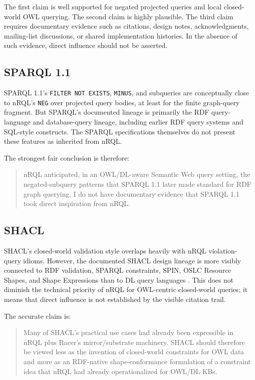 \documentclass[11pt,letterpaper]{article}
\newcommand{\nrql}{nRQL}
\newcommand{\shacl}{SHACL}
\begin{document}
The first claim is well supported for negated projected queries and local closed-world OWL querying. The second claim is highly plausible. The third claim requires documentary evidence such as citations, design notes, acknowledgments, mailing-list discussions, or shared implementation histories. In the absence of such evidence, direct influence should not be asserted.

\subsection{SPARQL 1.1}

SPARQL 1.1's \texttt{FILTER NOT EXISTS}, \texttt{MINUS}, and subqueries are conceptually close to \nrql{}'s \texttt{NEG} over projected query bodies, at least for the finite graph-query fragment. But SPARQL's documented lineage is primarily the RDF query-language and database-query lineage, including earlier RDF query systems and SQL-style constructs. The SPARQL specifications themselves do not present these features as inherited from \nrql{}.

The strongest fair conclusion is therefore:

\begin{quote}
\nrql{} anticipated, in an OWL/DL-aware Semantic Web query setting, the negated-subquery patterns that SPARQL 1.1 later made standard for RDF graph querying. I do not have documentary evidence that SPARQL 1.1 took direct inspiration from \nrql{}.
\end{quote}

\subsection{SHACL}

\shacl{}'s closed-world validation style overlaps heavily with \nrql{} violation-query idioms. However, the documented SHACL design lineage is more visibly connected to RDF validation, SPARQL constraints, SPIN, OSLC Resource Shapes, and Shape Expressions than to DL query languages \cite{spin,shacl}. This does not diminish the technical priority of \nrql{} for OWL-centric closed-world queries; it means that direct influence is not established by the visible citation trail.

The accurate claim is:

\begin{quote}
Many of SHACL's practical use cases had already been expressible in \nrql{} plus Racer's mirror/substrate machinery. SHACL should therefore be viewed less as the invention of closed-world constraints for OWL data and more as an RDF-native shape-conformance formulation of a constraint idea that \nrql{} had already operationalized for OWL/DL KBs.
\end{quote}
\end{document}
